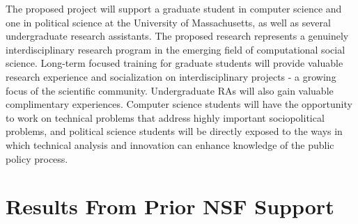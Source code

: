 The proposed project will support a graduate student in computer science and one in political science at the University of Massachusetts, as well as several undergraduate research assistants.  The proposed research represents a genuinely interdisciplinary research program in the emerging field of computational social science. Long-term focused training for graduate students will provide valuable research experience and socialization on interdisciplinary projects - a growing focus of the scientific community. Undergraduate RAs will also gain valuable complimentary experiences. Computer science students will have the opportunity to work on technical problems that address highly important sociopolitical problems, and political science students will be directly exposed to the ways in which technical analysis and innovation can enhance knowledge of the public policy process.

\section{Results From Prior NSF Support}




